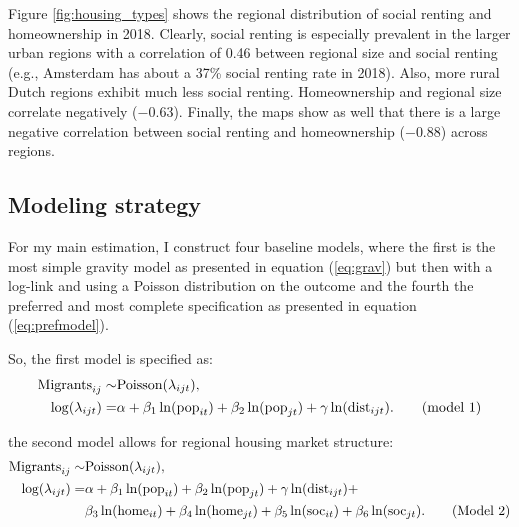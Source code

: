 \documentclass[11pt,parskip,abstracton,notitlepage, dvipsnames]{scrartcl}
\begin{document}
Figure \ref{fig:housing_types} shows the regional distribution of social renting
and homeownership in 2018. Clearly, social renting is especially prevalent in
the larger urban regions with a correlation of 0.46 between regional size and social
renting (e.g., Amsterdam has about a 37\% social renting rate in 2018). Also,
more rural Dutch regions exhibit much less social renting. Homeownership and
regional size correlate negatively ($-0.63$). Finally, the maps show as well that
there is a large negative correlation between social renting and homeownership
($-0.88$) across regions.

\subsection{Modeling strategy}

For my main estimation, I construct four baseline models, where the first is the most simple gravity model as presented in equation (\ref{eq:grav}) but then with a log-link and using a Poisson distribution on the outcome and the fourth the preferred and most complete specification as presented in equation (\ref{eq:prefmodel}).

So, the first model is specified as:
\begin{align} \text{Migrants}_{ij} \sim & \text{Poisson}(\lambda_{ijt}), \notag \\
  \log(\lambda_{ijt}) = & \alpha +
                          \beta_1 \ln(\text{pop}_{it}) +
                          \beta_2 \ln(\text{pop}_{jt}) +
                          \gamma \ln(\text{dist}_{ijt}).  
\tag{model 1}\label{eq:m1}
\end{align}

the second model allows for regional housing market structure:
\begin{align} \text{Migrants}_{ij} \sim & \text{Poisson}(\lambda_{ijt}), \notag \\
  \log(\lambda_{ijt}) = & \alpha + \beta_1 \ln(\text{pop}_{it}) + \beta_2
                          \ln(\text{pop}_{jt}) +
                          \gamma \ln(\text{dist}_{ijt}) + \notag \\
                                        & \beta_3 \ln(\text{home}_{it}) +
                                          \beta_4 \ln(\text{home}_{jt}) +
                                          \beta_5 \ln(\text{soc}_{it}) + \beta_6
                                          \ln(\text{soc}_{jt}). \tag{Model
                                          2} \label{eq:m2}
\end{align}
\end{document}
